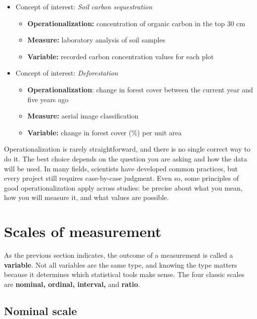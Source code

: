 \documentclass[
  letterpaper,
  DIV=11,
  numbers=noendperiod]{scrreprt}
\providecommand{\tightlist}{%
  \setlength{\itemsep}{0pt}\setlength{\parskip}{0pt}}\usepackage{longtable,booktabs,array}
\begin{document}
\begin{itemize}
\tightlist
\item
  Concept of interest: \emph{Soil carbon sequestration}

  \begin{itemize}
  \tightlist
  \item
    \textbf{Operationalization:} concentration of organic carbon in the
    top 30 cm
  \item
    \textbf{Measure:} laboratory analysis of soil samples
  \item
    \textbf{Variable:} recorded carbon concentration values for each
    plot
  \end{itemize}
\item
  Concept of interest: \emph{Deforestation}

  \begin{itemize}
  \tightlist
  \item
    \textbf{Operationalization}: change in forest cover between the
    current year and five years ago
  \item
    \textbf{Measure:} aerial image classification
  \item
    \textbf{Variable:} change in forest cover (\%) per unit area
  \end{itemize}
\end{itemize}

Operationalization is rarely straightforward, and there is no single
correct way to do it. The best choice depends on the question you are
asking and how the data will be used. In many fields, scientists have
developed common practices, but every project still requires
case-by-case judgment. Even so, some principles of good
operationalization apply across studies: be precise about what you mean,
how you will measure it, and what values are possible.

\section{Scales of measurement}\label{scales-of-measurement}

As the previous section indicates, the outcome of a measurement is
called a \textbf{variable}. Not all variables are the same type, and
knowing the type matters because it determines which statistical tools
make sense. The four classic scales are \textbf{nominal, ordinal,
interval,} and \textbf{ratio}.

\subsection{Nominal scale}\label{nominal-scale}
\end{document}
